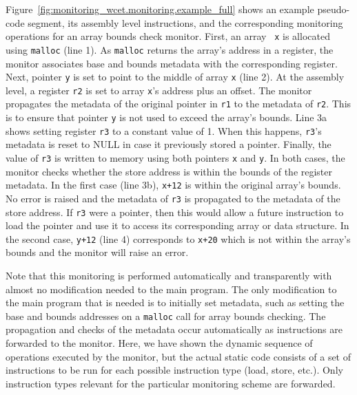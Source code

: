 Figure~\ref{fig:monitoring_wcet.monitoring.example_full} shows an example
pseudo-code segment, its assembly level instructions, and the corresponding
monitoring operations for an array bounds check monitor.  First, an array {\tt
x} is allocated using {\tt malloc} (line 1).  As {\tt malloc} returns the
array's address in a register, the monitor associates base and bounds metadata
with the corresponding register.  Next, pointer {\tt y} is set to point to the
middle of array {\tt x} (line 2).  At the assembly level, a register {\tt r2}
is set to array {\tt x}'s address plus an offset.  The monitor propagates the
metadata of the original pointer in {\tt r1} to the metadata of {\tt r2}. This
is to ensure that pointer {\tt y} is not used to exceed the array's bounds.
Line 3a shows setting register {\tt r3} to a constant value of 1.  When this
happens, {\tt r3}'s metadata is reset to NULL in case it previously stored a
pointer.  Finally, the value of {\tt r3} is written to memory using both
pointers {\tt x} and {\tt y}.  In both cases, the monitor checks whether the
store address is within the bounds of the register metadata. In the first case
(line 3b), {\tt x+12} is within the original array's bounds. No error is raised
and the metadata of {\tt r3} is propagated to the metadata of the store
address. If {\tt r3} were a pointer, then this would allow a future instruction
to load the pointer and use it to access its corresponding array or data
structure. In the second case, {\tt y+12} (line 4) corresponds to {\tt x+20}
which is not within the array's bounds and the monitor will raise an error. 

Note that this monitoring is performed automatically and transparently with
almost no modification needed to the main program. The only modification to the
main program that is needed is to initially set metadata, such as setting the
base and bounds addresses on a {\tt malloc} call for array bounds checking.
The propagation and checks of the metadata occur automatically as instructions
are forwarded to the monitor.  Here, we have shown the dynamic sequence of
operations executed by the monitor, but the actual static code consists of a
set of instructions to be run for each possible instruction type (load, store,
etc.). Only instruction types relevant for the particular monitoring scheme are
forwarded.



